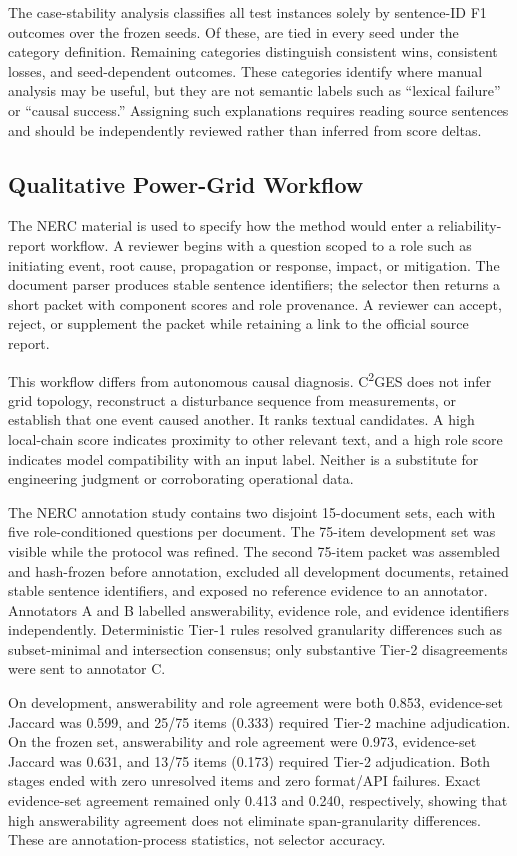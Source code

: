 \documentclass[applsci,article,submit,moreauthors]{Definitions/mdpi}
\newcommand{\cges}{C\textsuperscript{2}GES}
\begin{document}
The case-stability analysis classifies all \CaseCount{} test instances solely by sentence-ID F1 outcomes over the frozen seeds. Of these, \CaseAllTie{} are tied in every seed under the category definition. Remaining categories distinguish consistent wins, consistent losses, and seed-dependent outcomes. These categories identify where manual analysis may be useful, but they are not semantic labels such as ``lexical failure'' or ``causal success.'' Assigning such explanations requires reading source sentences and should be independently reviewed rather than inferred from score deltas.

\subsection{Qualitative Power-Grid Workflow}
The NERC material is used to specify how the method would enter a reliability-report workflow. A reviewer begins with a question scoped to a role such as initiating event, root cause, propagation or response, impact, or mitigation. The document parser produces stable sentence identifiers; the selector then returns a short packet with component scores and role provenance. A reviewer can accept, reject, or supplement the packet while retaining a link to the official source report.

This workflow differs from autonomous causal diagnosis. \cges{} does not infer grid topology, reconstruct a disturbance sequence from measurements, or establish that one event caused another. It ranks textual candidates. A high local-chain score indicates proximity to other relevant text, and a high role score indicates model compatibility with an input label. Neither is a substitute for engineering judgment or corroborating operational data.

The NERC annotation study contains two disjoint 15-document sets, each with five role-conditioned questions per document. The 75-item development set was visible while the protocol was refined. The second 75-item packet was assembled and hash-frozen before annotation, excluded all development documents, retained stable sentence identifiers, and exposed no reference evidence to an annotator. Annotators A and B labelled answerability, evidence role, and evidence identifiers independently. Deterministic Tier-1 rules resolved granularity differences such as subset-minimal and intersection consensus; only substantive Tier-2 disagreements were sent to annotator C.

On development, answerability and role agreement were both 0.853, evidence-set Jaccard was 0.599, and 25/75 items (0.333) required Tier-2 machine adjudication. On the frozen set, answerability and role agreement were 0.973, evidence-set Jaccard was 0.631, and 13/75 items (0.173) required Tier-2 adjudication. Both stages ended with zero unresolved items and zero format/API failures. Exact evidence-set agreement remained only 0.413 and 0.240, respectively, showing that high answerability agreement does not eliminate span-granularity differences. These are annotation-process statistics, not selector accuracy.
\end{document}
